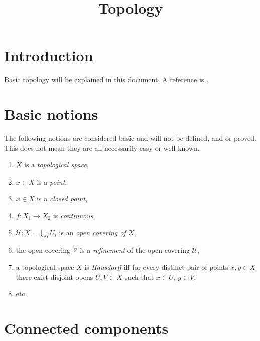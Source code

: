 

%


\title{Topology}


\maketitle

\tableofcontents

\section{Introduction}
\label{section-introduction}

\noindent
Basic topology will be explained in this document.
A reference is \cite{Engelking}.

\section{Basic notions}
\label{section-topology-basic}

\noindent
The following notions are considered basic and will not be defined,
and or proved. This does not mean they are all necessarily easy or 
well known.

\begin{enumerate}
\item $X$ is a {\it topological space},
\label{space}
\item $x\in X$ is a {\it point},
\label{point}
\item $x\in X$ is a {\it closed point},
\label{closed-point}
\item $f : X_1 \to X_2$ is {\it continuous},
\label{continuous}
\item $\mathcal{U} : X = \bigcup_i U_i$ is an {\it open covering of} $X$,
\label{covering}
\item the open covering $\mathcal{V}$ is a {\it refinement}
of the open covering $\mathcal{U}$,
\label{refinement}
\item a topological space $X$ is {\it Hausdorff} iff for every
distinct pair of points $x, y \in X$ there exist disjoint
opens $U, V \subset X$ such that $x \in U$, $y \in V$,
\label{Hausdorff}
\item etc.
\end{enumerate}

\section{Connected components}
\label{section-connected-components}

